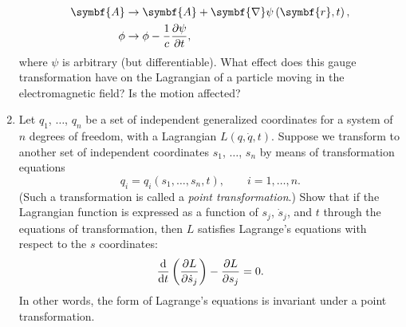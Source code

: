 \begin{enumerate}
    \begin{equation*}
        \begin{aligned}
            \symbf{A}&\to\symbf{A}+\symbf{\nabla}\psi\left(\symbf{r},t\right),\\
            \phi&\to\phi-\frac{1}{c}\pdv{\psi}{t},
        \end{aligned}
    \end{equation*}
    where \(\psi\) is arbitrary (but differentiable). What effect does this gauge transformation have on the Lagrangian of a particle moving in the electromagnetic field? Is the motion affected?
    \item\label{derivation:1.10} Let \(q_1\), \(\ldots\), \(q_n\) be a set of independent generalized coordinates for a system of \(n\) degrees of freedom, with a Lagrangian \(L\left(q,\dot{q},t\right)\). Suppose we transform to another set of independent coordinates \(s_1\), \(\ldots\), \(s_n\) by means of transformation equations
    \begin{equation*}
        q_i=q_i\left(s_1,\ldots,s_n,t\right),\qquad i=1,\ldots,n.
    \end{equation*}
    (Such a transformation is called a \emph{point transformation}.) Show that if the Lagrangian function is expressed as a function of \(s_j\), \(\dot{s}_j\), and \(t\) through the equations of transformation, then \(L\) satisfies Lagrange's equations with respect to the \(s\) coordinates:
    \begin{equation*}
        \odv*{\left(\pdv{L}{\dot{s}_j}\right)}{t}-\pdv{L}{s_j}=0.
    \end{equation*}
    In other words, the form of Lagrange's equations is invariant under a point transformation. 
\end{enumerate}
